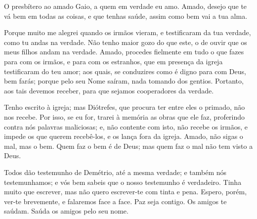 
O presbítero ao amado Gaio, a quem em verdade eu amo. Amado,
desejo que te vá bem em todas as coisas, e que tenhas saúde, assim
como bem vai a tua alma.

Porque muito me alegrei quando os irmãos vieram, e testificaram da
tua verdade, como tu andas na verdade. Não tenho maior gozo do
que este, o de ouvir que os meus filhos andam na verdade. Amado,
procedes fielmente em tudo o que fazes para com os irmãos, e para
com os estranhos, que em presença da igreja testificaram do teu
amor; aos quais, se conduzires como é digno para com Deus, bem
farás; porque pelo seu Nome saíram, nada tomando dos gentios.
Portanto, aos tais devemos receber, para que sejamos
cooperadores da verdade.

Tenho escrito à igreja; mas Diótrefes, que procura ter entre eles
o primado, não nos recebe. Por isso, se eu for, trarei à
memória as obras que ele faz, proferindo contra nós palavras
maliciosas; e, não contente com isto, não recebe os irmãos, e impede
os que querem recebê-los, e os lança fora da igreja. Amado,
não sigas o mal, mas o bem. Quem faz o bem é de Deus; mas quem faz o
mal não tem visto a Deus.

Todos dão testemunho de Demétrio, até a mesma verdade; e também
nós testemunhamos; e vós bem sabeis que o nosso testemunho é
verdadeiro. Tinha muito que escrever, mas não quero
escrever-te com tinta e pena. Espero, porém, ver-te
brevemente, e falaremos face a face. Paz seja contigo. Os
amigos te saúdam. Saúda os amigos pelo seu nome.


